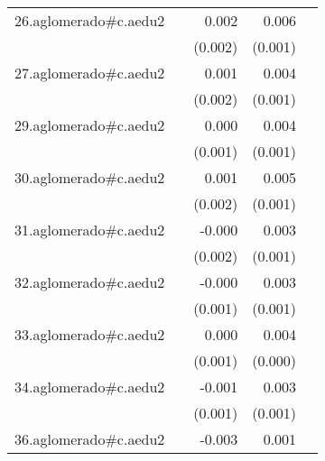 {\begin{longtable}{l*{4}{D{.}{.}{-1}}}
\addlinespace
26.aglomerado#c.aedu2&                     &       0.002         &       0.006\sym{***}&                     \\
            &                     &     (0.002)         &     (0.001)         &                     \\
\addlinespace
27.aglomerado#c.aedu2&                     &       0.001         &       0.004\sym{***}&                     \\
            &                     &     (0.002)         &     (0.001)         &                     \\
\addlinespace
29.aglomerado#c.aedu2&                     &       0.000         &       0.004\sym{***}&                     \\
            &                     &     (0.001)         &     (0.001)         &                     \\
\addlinespace
30.aglomerado#c.aedu2&                     &       0.001         &       0.005\sym{***}&                     \\
            &                     &     (0.002)         &     (0.001)         &                     \\
\addlinespace
31.aglomerado#c.aedu2&                     &      -0.000         &       0.003\sym{*}  &                     \\
            &                     &     (0.002)         &     (0.001)         &                     \\
\addlinespace
32.aglomerado#c.aedu2&                     &      -0.000         &       0.003\sym{**} &                     \\
            &                     &     (0.001)         &     (0.001)         &                     \\
\addlinespace
33.aglomerado#c.aedu2&                     &       0.000         &       0.004\sym{***}&                     \\
            &                     &     (0.001)         &     (0.000)         &                     \\
\addlinespace
34.aglomerado#c.aedu2&                     &      -0.001         &       0.003\sym{**} &                     \\
            &                     &     (0.001)         &     (0.001)         &                     \\
\addlinespace
36.aglomerado#c.aedu2&                     &      -0.003         &       0.001         &                     \\

\end{longtable}}
